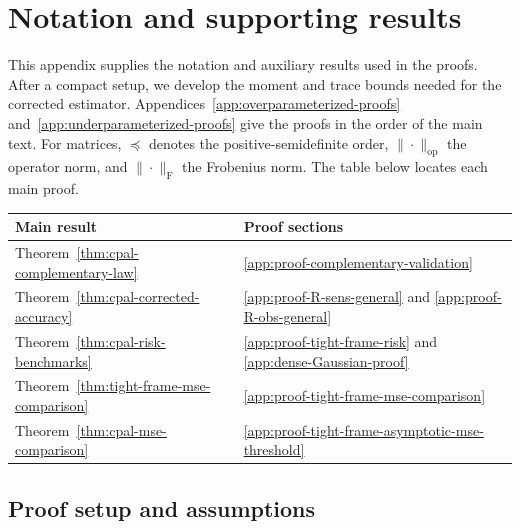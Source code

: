 \documentclass{article}
\theoremstyle{plain}
\theoremstyle{definition}
\theoremstyle{definition}
\begin{document}
\FloatBarrier

\clearpage

\section{Notation and supporting results}
\label{app:extended-results}

This appendix supplies the notation and auxiliary results used in the
proofs. After a compact setup, we develop the moment and trace bounds
needed for the corrected estimator. Appendices~\ref{app:overparameterized-proofs}
and~\ref{app:underparameterized-proofs} give the proofs in the order of
the main text.
For matrices, $\preceq$ denotes the positive-semidefinite order,
$\|\cdot\|_{\mathrm{op}}$ the operator norm, and
$\|\cdot\|_{\mathrm F}$ the Frobenius norm.
The table below locates each main proof.
\begin{center}
\begin{tabular}{@{}ll@{}}
\toprule
Main result & Proof sections \\
\midrule
Theorem~\ref{thm:cpal-complementary-law} & \ref{app:proof-complementary-validation} \\
Theorem~\ref{thm:cpal-corrected-accuracy} & \ref{app:proof-R-sens-general} and \ref{app:proof-R-obs-general} \\
Theorem~\ref{thm:cpal-risk-benchmarks} & \ref{app:proof-tight-frame-risk} and \ref{app:dense-Gaussian-proof} \\
Theorem~\ref{thm:tight-frame-mse-comparison} & \ref{app:proof-tight-frame-mse-comparison} \\
Theorem~\ref{thm:cpal-mse-comparison} & \ref{app:proof-tight-frame-asymptotic-mse-threshold} \\
\bottomrule
\end{tabular}
\end{center}

\subsection{Proof setup and assumptions}
\label{app:proof-setup}
\end{document}
